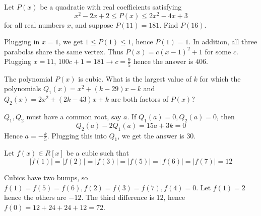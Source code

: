 \documentclass[11pt]{scrartcl}
\begin{document}
\begin{example}
  [AIME 2010]
  Let $P(x)$ be a quadratic with real coefficients satisfying
  $$x^2-2x+2\le P(x)\le 2x^2-4x+3$$
  for all real numbers $x$, and suppose $P(11)=181$. Find $P(16)$.
\end{example}
\begin{soln}
  Plugging in $x=1$, we get $1\le P(1)\le 1$, hence $P(1)=1$. In addition, all three parabolas share the same vertex.
  Thus $P(x)=c(x-1)^2+1$ for some $c$. Plugging $x=11$, $100c+1=181\to c=\frac{9}{5}$ hence the answer is $406$.
\end{soln}
\begin{example}
  [AIME 2007]
  The polynomial $P(x)$ is cubic. What is the largest value of $k$ for which
  the polynomials $Q_1(x)=x^2+(k-29)x-k$ and $Q_2(x)=2x^2+(2k-43)x+k$ are
  both factors of $P(x)$?
\end{example}
\begin{soln}
  $Q_1, Q_2$ must have a common root, say $a$. If $Q_1(a)=0, Q_2(a)=0$, then
  $$Q_2(a)-2Q_1(a)=15a+3k=0$$
  Hence $a=-\frac{k}{5}$. Plugging this into $Q_1$, we get the answer is $30$.
\end{soln}
\begin{example}
  [AIME 2015]
  Let $f(x)\in R[x]$ be a cubic such that
  $$|f(1)|=|f(2)|=|f(3)|=|f(5)|=|f(6)|=|f(7)|=12$$
\end{example}
\begin{soln}
  Cubics have two bumps, so $f(1)=f(5)=f(6), f(2)=f(3)=f(7), f(4)=0$.
  Let $f(1)=2$ hence the others are $-12$. The third difference is $12$,
  hence $f(0)=12+24+24+12=72$.
\end{soln}
\end{document}
